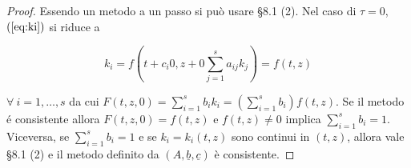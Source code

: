 \documentclass[hidelinks, 10pt]{report}
\begin{document}
\begin{proof}
Essendo un metodo a un passo si pu\`o usare \S 8.1 (2). Nel caso di $ \tau = 0 $, $ (\ref{eq:ki}) $ si riduce a

\[ k_{i} = f \left(t + c_{i} 0, z + 0 \sum\limits_{j = 1}^{s} a_{ij} k_{j} \right) = f(t, z) \]

$ \forall\ i = 1, \dotsc, s $ da cui $ F(t, z, 0) = \sum\limits_{i = 1}^{s} b_{i} k_{i} = \left( \sum\limits_{i = 1}^{s} b_{i} \right) f(t, z) $. Se il metodo \'e consistente allora $ F(t, z, 0) = f(t, z) $ e $ f(t, z) \ne 0 $ implica $ \sum\limits_{i = 1}^{s} b_{i} = 1 $. Viceversa, se $ \sum\limits_{i = 1}^{s} b_{i} = 1 $ e se $ k_{i} = k_{i} (t, z) $ sono continui in $ (t, z) $, allora vale \S 8.1 (2)  e il metodo definito da $ (A, \underline{b}, \underline{c}) $ \`e consistente.
\end{proof}
\end{document}
